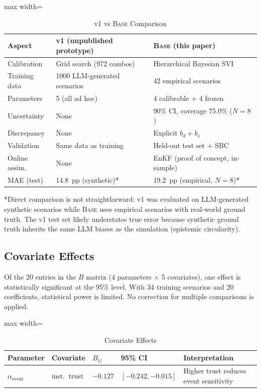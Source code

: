 \documentclass[12pt]{article}
\begin{document}
\begin{table}[H]
\centering
\caption{v1 vs \textsc{Base} Comparison}
\label{tab:v1v2}
\begin{adjustbox}{max width=\textwidth}
\begin{tabular}{@{}lll@{}}
\toprule
Aspect & v1 (unpublished prototype) & \textsc{Base} (this paper) \\
\midrule
Calibration & Grid search (972 combos) & Hierarchical Bayesian SVI \\
Training data & 1000 LLM-generated scenarios & 42 empirical scenarios \\
Parameters & 5 (all ad hoc) & 4 calibrable + 4 frozen \\
Uncertainty & None & 90\% CI, coverage 75.0\% ($N{=}8$) \\
Discrepancy & None & Explicit $b_d + b_s$ \\
Validation & Same data as training & Held-out test set + SBC \\
Online assim. & None & EnKF (proof of concept, in-sample) \\
MAE (test) & 14.8~pp (synthetic)* & 19.2~pp (empirical, $N{=}8$)* \\
\bottomrule
\end{tabular}
\end{adjustbox}

\vspace{4pt}
\footnotesize
*Direct comparison is not straightforward: v1 was evaluated on LLM-generated synthetic scenarios while \textsc{Base} uses empirical scenarios with real-world ground truth. The v1 test set likely understates true error because synthetic ground truth inherits the same LLM biases as the simulation (epistemic circularity).
\end{table}

\subsection{Covariate Effects}

Of the 20 entries in the $B$ matrix (4 parameters $\times$ 5 covariates), one effect is statistically significant at the 95\% level. With 34 training scenarios and 20 coefficients, statistical power is limited. No correction for multiple comparisons is applied.

\begin{table}[H]
\centering
\caption{Covariate Effects}
\label{tab:covariates}
\begin{adjustbox}{max width=\textwidth}
\begin{tabular}{@{}lllll@{}}
\toprule
Parameter & Covariate & $B_{ij}$ & 95\% CI & Interpretation \\
\midrule
$\alpha_{\text{event}}$ & inst.\ trust & $-0.127$ & $[-0.242, -0.015]$ & Higher trust reduces event sensitivity \\
\bottomrule
\end{tabular}
\end{adjustbox}
\end{table}
\end{document}
